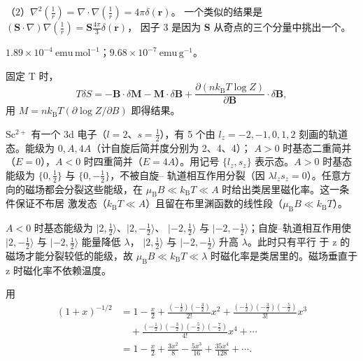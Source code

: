 （2）$\nabla^{2}(\frac{1}{r})=\nabla\cdot\nabla(\frac{1}{r})=4\pi\delta(\mathbf{r})$。
一个类似的结果是 $(\mathbf{S}\cdot\nabla)\nabla(\frac{1}{r})=\mathbf{S}\frac{4\pi}{3}\delta(\mathbf{r})$，
因子 3 是因为 $\mathbf{S}$ 从奇点的三个分量中挑出一个。

 $1.89\times10^{-4}\ \mathrm{emu\,mol^{-1}}$；$9.68\times10^{-7}\ \mathrm{emu\,g^{-1}}$。

 固定 T 时，
\begin{equation*}
T\delta S = -\mathbf{B}\cdot\delta\mathbf{M} - \mathbf{M}\cdot\delta\mathbf{B} + \frac{\partial(nk_{\mathrm{B}}T\log Z)}{\partial\mathbf{B}}\cdot\delta\mathbf{B},\tag{F.19}
\end{equation*}
用 $M=nk_{\mathrm{B}}T(\partial\log Z/\partial B)$ 即得结果。

 $\mathrm{Sc^{2+}}$ 有一个 3d 电子（$l=2$、$s=\frac{1}{2}$），有 5 个由
$l_z=-2,-1,0,1,2$ 刻画的轨道态。能级为 $0, A, 4A$（计自旋后简并度分别为 2、4、4）；
$A>0$ 时基态二重简并（$E=0$），$A<0$ 时四重简并（$E=4A$）。用记号 $\{l_z, s_z\}$
表示态。$A>0$ 时基态能级为 $\{0,\frac{1}{2}\}$ 与 $\{0,-\frac{1}{2}\}$，不被自旋--
轨道相互作用分裂（因 $\lambda l_zs_z=0$）。任意方向的磁场都会分裂这些能级，在
$\mu_{\mathrm{B}}B\ll k_{\mathrm{B}}T\ll A$ 时给出类居里磁化率。这一条件保证不布居
激发态（$k_{\mathrm{B}}T\ll A$）且留在布里渊函数的线性段（$\mu_{\mathrm{B}}B\ll k_{\mathrm{B}}T$）。

$A<0$ 时基态能级为 $|2,\frac{1}{2}\rangle$、$|2,-\frac{1}{2}\rangle$、
$|-2,\frac{1}{2}\rangle$ 与 $|-2,-\frac{1}{2}\rangle$；自旋--轨道相互作用使
$|2,-\frac{1}{2}\rangle$ 与 $|-2,\frac{1}{2}\rangle$ 能量降低 $\lambda$，
$|2,\frac{1}{2}\rangle$ 与 $|-2,-\frac{1}{2}\rangle$ 升高 $\lambda$。此时只有平行
于 z 的磁场才能分裂较低的能级，故 $\mu_{\mathrm{B}}B\ll k_{\mathrm{B}}T\ll\lambda$
时磁化率是类居里的。磁场垂直于 z 时磁化率不依赖温度。

 用
\begin{align*}
(1+x)^{-1/2} &= 1-\frac{x}{2}+\frac{(-\frac{1}{2})(-\frac{3}{2})}{2!}x^{2}+\frac{(-\frac{1}{2})(-\frac{3}{2})(-\frac{5}{2})}{3!}x^{3}\\
&\quad + \frac{(-\frac{1}{2})(-\frac{3}{2})(-\frac{5}{2})(-\frac{7}{2})}{4!}x^{4}+\cdots\\
&= 1-\frac{x}{2}+\frac{3x^{2}}{8}-\frac{5x^{3}}{16}+\frac{35x^{4}}{128}+\cdots.\tag{F.20}
\end{align*}

